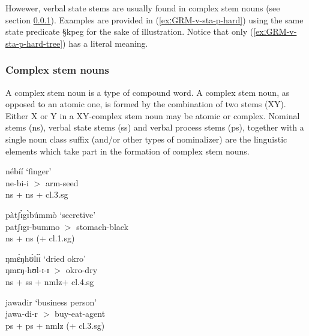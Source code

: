 Howewer, verbal state stems are usually found in complex stem nouns (see
section \ref{sec:GRM-com-stem-noun}).  Examples  are provided in
(\ref{exːGRM-v-sta-p-hard}) using the same  state predicate {\S kpeg} for
the sake of illustration.  Notice that only (\ref{exːGRM-v-sta-p-hard-tree}) has
a literal meaning.










 


\subsubsection{Complex stem nouns}
\label{sec:GRM-com-stem-noun}

A complex stem noun is a type of compound word.
A  complex stem noun, as opposed to an atomic one,  is formed by the
combination of two stems (XY). Either X or Y in a  XY-complex stem noun may be 
atomic or complex.  Nominal stems ({\sc ns}), verbal state stems ({\sc ss}) and
verbal process stems ({\sc ps}), together with a single noun class  suffix 
(and/or other
types of nominalizer) are
the linguistic elements which take part in the
formation of complex stem nouns. 


\begin{exe}
 \ex\label{exːGRM-cplx-stm}
 \begin{xlist}

  \ex\label{exːGRM-cplx-stm-NS-NS-1}%
{\I nébíí}  `finger' \\  %
ne-bi-i  $>$  {\sc arm-seed} \\%
 {\sc ns} + {\sc ns} + {\sc cl.3.sg}
 

  \ex\label{exːGRM-cplx-stm-NS-NS-2}
 {\I pàtʃɪ̀gɪ̀búmmò} `secretive' \\ %
patʃɪgɪ-bummo  $>$  {\sc stomach-black}  \\  %
 {\sc ns} + {\sc ns} (+ {\sc cl.1.sg})

 \ex\label{exːGRM-cplx-stm-NS-SS}
 {\I ŋmɛ́ŋhʊ̀lɪ́ɪ̀} `dried okro' \\ %
ŋmɛŋ-hʊl-ɪ-ɪ $>$   {\sc okro-dry}  \\  %
 {\sc ns} + {\sc ss} + {\sc nmlz}+ {\sc cl.4.sg}
 
 \ex\label{exːGRM-cplx-stm-PS-PS}
 {\I jawadir} `business person' \\ %
jawa-di-r  $>$ {\sc buy-eat-agent} \\  %
 {\sc ps} + {\sc ps} + {\sc nmlz} (+ {\sc cl.3.sg})

 \end{xlist}
\end{exe}

